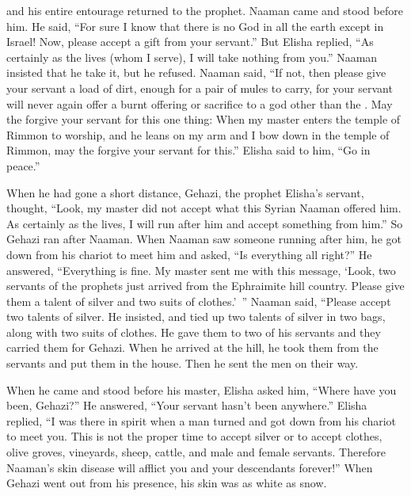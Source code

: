 {and his entire
entourage
returned
to
the prophet.
Naaman came
and stood
before
him. He said,
“For sure
I know
that
there is no
God
in all
the earth
except
in Israel! Now,
please
accept
a gift
from your servant.”
But Elisha replied,
“As certainly as the
{}
lives
(whom
I serve), I will
take
nothing from you.” Naaman insisted
that he take
it, but he refused.
Naaman
said,
“If not,
then
please
give
your servant
a load
of dirt,
enough for
a pair
of mules
to carry,
for
your servant
will never
again
offer a burnt offering
or sacrifice
to a god
other
than the
{}.
May the
{}
forgive
your servant
for this
one thing: When my master
enters
the temple
of Rimmon
to worship,
and he
leans
on
my arm
and I bow down
in the temple
of Rimmon,
may
the {}
forgive
your servant
for this.”
Elisha said
to him, “Go
in peace.”
\par }{\PP When he had gone
a short distance,
Gehazi,
the prophet
Elisha’s
servant,
thought, “Look,
my master
did not accept
what this
Syrian
Naaman
offered him. As certainly as the
{}
lives,
I will run
after
him and accept
something from him.”
So Gehazi
ran after
Naaman.
When Naaman
saw
someone running
after
him, he got down
from his chariot
to meet
him and asked,
“Is everything all right?”
He answered,
“Everything
is fine. My master
sent
me with this message, ‘Look,
two
servants
of the prophets
just
arrived
from the Ephraimite
hill country.
Please
give
them a talent
of silver
and two
suits
of clothes.’ ”
Naaman
said,
“Please
accept
two talents
of silver. He insisted,
and tied up
two talents
of silver
in two
bags,
along with two
suits
of clothes.
He gave
them to
two
of his servants
and they carried
them for Gehazi.
When he arrived
at the hill,
he took
them from
the servants
and put them
in the house.
Then he sent
the
men
on their way.
\par }{\PP {}When he came
and stood
before his master,
Elisha
asked
him,
“Where
have you been, Gehazi?” He answered,
“Your servant
hasn’t
been anywhere.”
Elisha replied,
“I was there in spirit when a man
turned
and got down from his chariot
to meet
you. This is not
the proper
time
to accept
silver
or to accept
clothes,
olive groves,
vineyards,
sheep,
cattle,
and male and female
servants.
Therefore Naaman’s
skin disease
will afflict
you and your descendants
forever!” When Gehazi went out
from his presence,
his skin
was as white as snow.

}
